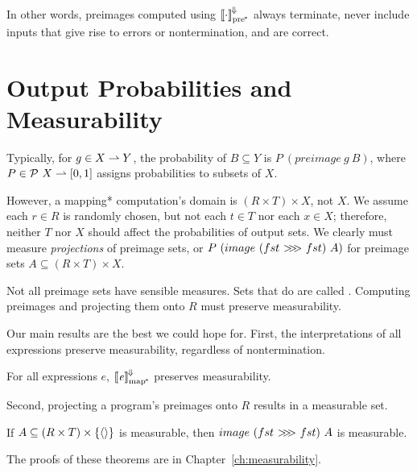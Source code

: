 In other words, preimages computed using $\left\llbracket{\cdot}\right\rrbracket^{\mspace{-2mu}\Downarrow\mspace{-2mu}}_\mathrm{pre^{\mspace{-2mu}*}}$ always terminate, never include inputs that give rise to errors or nontermination, and are correct.


\section{Output Probabilities and Measurability}
\label{sec:measurability}

Typically, for $g \in X \rightharpoonup Y$, the probability of $B \subseteq Y$ is $P~(preimage~g~B)$, where $P \in \mathcal{P}~X \rightharpoonup [0,1]$ assigns probabilities to subsets of $X$.

However, a mapping* computation's domain is $(R \times T) \times X$, not $X$.
We assume each $r \in R$ is randomly chosen, but not each $t \in T$ nor each $x \in X$; therefore, neither $T$ nor $X$ should affect the probabilities of output sets.
We clearly must measure \emph{projections} of preimage sets, or $P~(image~(fst~{>}\mspace{-6mu}{>}\mspace{-6mu}{>}~fst)~A)$ for preimage sets $A \subseteq (R \times T) \times X$. 

Not all preimage sets have sensible measures.
Sets that do are called .
Computing preimages and projecting them onto $R$ must preserve measurability.

Our main results are the best we could hope for.
First, the interpretations of all expressions preserve measurability, regardless of nontermination.

\begin{theorem}
For all expressions $\mathit{e}$, $\left\llbracket{\mathit{e}}\right\rrbracket^{\mspace{-2mu}\Downarrow\mspace{-2mu}}_\mathrm{map^{\mspace{-2mu}*}}$ preserves measurability.
\end{theorem}

Second, projecting a program's preimages onto $R$ results in a measurable set.

\begin{theorem}
If $A \subseteq (R \times T) \times \{{\langle{}\rangle}\}$ is measurable, then $image~(fst~{>}\mspace{-6mu}{>}\mspace{-6mu}{>}~fst)~A$ is measurable.
\end{theorem}

The proofs of these theorems are in Chapter~\ref{ch:measurability}.


